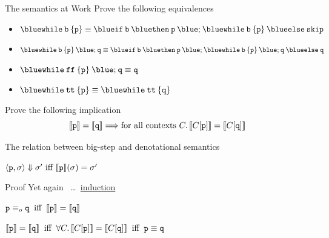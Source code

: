 \documentclass{beamer}
\begin{document}
\begin{frame}{The semantics at Work}
        Prove the following equivalences
        \begin{itemize}
                \item $\mathtt{{\blue while} \> b \> \{ p \} } \equiv
                        \mathtt{{\blue if} \> b \> {\blue then} \> p \> {\blue ;} \>
                        \mathtt{{\blue while} \> b \> \{ p \} } 
                        \> {\blue else} \> skip}$
                \item $\mathtt{{\blue while} \> b \> \{ p \} } \> {\blue ;} \> \mathtt{q} \equiv
                      \mathtt{{\blue if} \> b \> {\blue then} \> p \> {\blue ;}  \> {\blue while} \> b \> \{ p \}
                      \> {\blue ;} \> q
                      \> {\blue else} \> q}$
                \item $\mathtt{{\blue while} \> ff \> \{ p \} \> {\blue ;} \> q } \equiv \mathtt{q}$
                \item $\mathtt{{\blue while} \> tt \> \{ p \} } \equiv
                      \mathtt{{\blue while} \> tt \> \{ q \} }$

        \end{itemize}

        \pause
        \smallskip
        Prove the following implication
        \[
                \llbracket \mathtt{p} \rrbracket = \llbracket \mathtt{q} \rrbracket \Longrightarrow
                \text{for all contexts } C. \,
                \llbracket C[\mathtt{p}] \rrbracket = \llbracket C[\mathtt{q}] \rrbracket
        \]
\end{frame}

\begin{frame}{The relation between big-step and denotational semantics}

        \begin{theorem}
                $\langle \mathtt{p}, \sigma \rangle \Downarrow \sigma' \text{ iff }
                \llbracket \mathtt{p} \rrbracket(\sigma) = \sigma'$
        \end{theorem}

        \begin{block}{Proof}
                Yet again \, \dots \, \alert{\underline{induction}}
        \end{block}

        \bigskip
        \begin{corollary}
                $\mathtt{p} \equiv_o \mathtt{q} \> \text{ iff } \> \llbracket \mathtt{p} \rrbracket =
                \llbracket \mathtt{q} \rrbracket$
        \end{corollary}

        \smallskip
        \begin{corollary}
                $
                \llbracket \mathtt{p} \rrbracket = \llbracket \mathtt{q} \rrbracket \> \text{ iff } \>
                \forall C. \, \llbracket C[\mathtt{p}] \rrbracket = \llbracket C[\mathtt{q}] \rrbracket 
                \> \text{ iff } \>
                \mathtt{p} \equiv \mathtt{q}
                $
        \end{corollary}

\end{frame}
\end{document}
